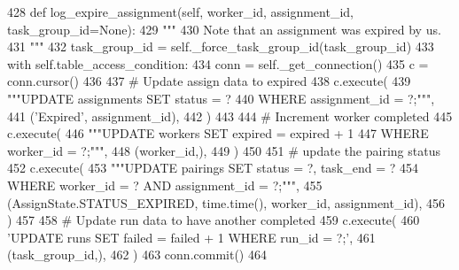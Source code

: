 \begin{DoxyCode}
428     \textcolor{keyword}{def }log\_expire\_assignment(self, worker\_id, assignment\_id, task\_group\_id=None):
429         \textcolor{stringliteral}{"""}
430 \textcolor{stringliteral}{        Note that an assignment was expired by us.}
431 \textcolor{stringliteral}{        """}
432         task\_group\_id = self.\_force\_task\_group\_id(task\_group\_id)
433         with self.table\_access\_condition:
434             conn = self.\_get\_connection()
435             c = conn.cursor()
436 
437             \textcolor{comment}{# Update assign data to expired}
438             c.execute(
439                 \textcolor{stringliteral}{"""UPDATE assignments SET status = ?}
440 \textcolor{stringliteral}{                         WHERE assignment\_id = ?;"""},
441                 (\textcolor{stringliteral}{'Expired'}, assignment\_id),
442             )
443 
444             \textcolor{comment}{# Increment worker completed}
445             c.execute(
446                 \textcolor{stringliteral}{"""UPDATE workers SET expired = expired + 1}
447 \textcolor{stringliteral}{                         WHERE worker\_id = ?;"""},
448                 (worker\_id,),
449             )
450 
451             \textcolor{comment}{# update the pairing status}
452             c.execute(
453                 \textcolor{stringliteral}{"""UPDATE pairings SET status = ?, task\_end = ?}
454 \textcolor{stringliteral}{                         WHERE worker\_id = ? AND assignment\_id = ?;"""},
455                 (AssignState.STATUS\_EXPIRED, time.time(), worker\_id, assignment\_id),
456             )
457 
458             \textcolor{comment}{# Update run data to have another completed}
459             c.execute(
460                 \textcolor{stringliteral}{'UPDATE runs SET failed = failed + 1 WHERE run\_id = ?;'},
461                 (task\_group\_id,),
462             )
463             conn.commit()
464 
\end{DoxyCode}
\mbox{\label{classparlai_1_1mturk_1_1core_1_1mturk__data__handler_1_1MTurkDataHandler_a2e2a4005391d49b70050c73315424f5a}} 
